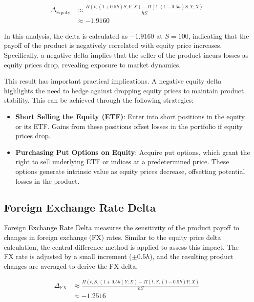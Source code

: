 \documentclass[a4paper, twocolumn]{article}
\begin{document}
\begin{align*}
\Delta_{\text{Equity}} &\approx \frac{\Pi(t, (1 + 0.5h)S, Y; X) - \Pi(t, (1 - 0.5h)S, Y; X)}{hS} \\
&\approx -1.9160
\end{align*}

In this analysis, the delta is calculated as $-1.9160$ at $S = 100$, indicating that the payoff of the product is negatively correlated with equity price increases. Specifically, a negative delta implies that the seller of the product incurs losses as equity prices drop, revealing exposure to market dynamics.

This result has important practical implications. A negative equity delta highlights the need to hedge against dropping equity prices to maintain product stability. This can be achieved through the following strategies:

\begin{itemize}

    \item \textbf{Short Selling the Equity (ETF)}: Enter into short positions in the equity or its ETF. Gains from these positions offset losses in the portfolio if equity prices drop.

    \item \textbf{Purchasing Put Options on Equity}: Acquire put options, which grant the right to sell underlying ETF or indices at a predetermined price. These options generate intrinsic value as equity prices decrease, offsetting potential losses in the product.
    
\end{itemize}

\subsection{Foreign Exchange Rate Delta}

Foreign Exchange Rate Delta measures the sensitivity of the product payoff to changes in foreign exchange (FX) rates. Similar to the equity price delta calculation, the central difference method is applied to assess this impact. The FX rate is adjusted by a small increment ($\pm 0.5h$), and the resulting product changes are averaged to derive the FX delta.

\begin{align*}
\Delta_{\text{FX}} &\approx \frac{\Pi(t, S, (1 + 0.5h)Y; X) - \Pi(t, S, (1 - 0.5h)Y; X)}{hS} \\
&\approx -1.2516
\end{align*}
\end{document}
